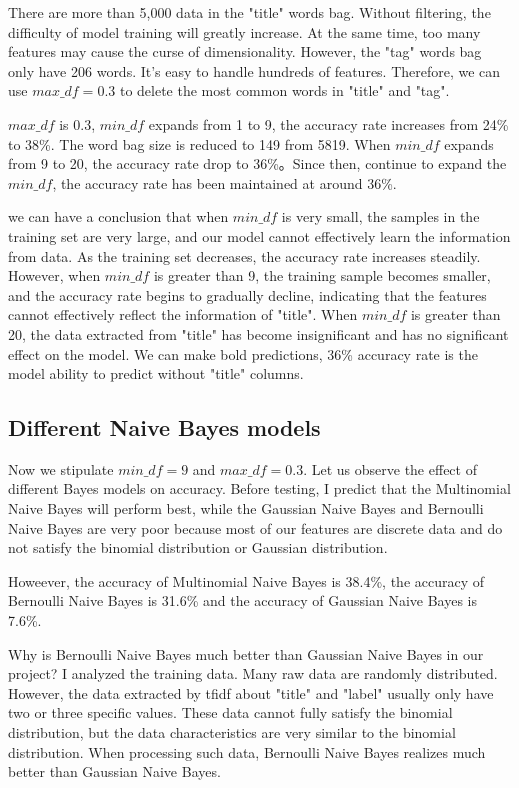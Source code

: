 \documentclass[11pt]{article}
\begin{document}
There are more than 5,000 data in the "title" words bag. Without filtering, the difficulty of model training will greatly increase. At the same time, too many features may cause the curse of dimensionality. However, the "tag" words bag only have 206 words. It's easy to handle hundreds of features. Therefore, we can use $max\_df = 0.3$ to delete the most common words in "title" and "tag".

$max\_df$ is 0.3, $min\_df$ expands from 1 to 9, the accuracy rate increases from 24\% to 38\%. The word bag size is reduced to 149 from 5819. When $min\_df$ expands from 9 to 20, the accuracy rate drop to 36\%。Since then, continue to expand the $min\_df$, the accuracy rate has been maintained at around 36\%.

we can have a conclusion that when $min\_df$ is very small, the samples in the training set are very large, and our model cannot effectively learn the information from data. As the training set decreases, the accuracy rate increases steadily. However, when $min\_df$ is greater than 9, the training sample becomes smaller, and the accuracy rate begins to gradually decline, indicating that the features cannot effectively reflect the information of "title". When $min\_df$ is greater than 20, the data extracted from "title" has become insignificant and has no significant effect on the model. We can make bold predictions, 36\% accuracy rate is the model ability to predict without "title" columns.

\subsection{Different Naive Bayes models}
Now we stipulate $min\_df=9$ and $max\_df = 0.3$. Let us observe the effect of different Bayes models on accuracy. Before testing, I predict that the Multinomial Naive Bayes will perform best, while the Gaussian Naive Bayes and Bernoulli Naive Bayes are very poor because most of our features are discrete data and do not satisfy the binomial distribution or Gaussian distribution.

Howeever, the accuracy of Multinomial Naive Bayes is 38.4\%, the accuracy of Bernoulli Naive Bayes is 31.6\% and the accuracy of Gaussian Naive Bayes is 7.6\%.

Why is Bernoulli Naive Bayes much better than Gaussian Naive Bayes in our project? I analyzed the training data. Many raw data are randomly distributed. However, the data extracted by tfidf about "title" and "label" usually only have two or three specific values. These data cannot fully satisfy the binomial distribution, but the data characteristics are very similar to the binomial distribution. When processing such data, Bernoulli Naive Bayes realizes much better than Gaussian Naive Bayes.
\end{document}

